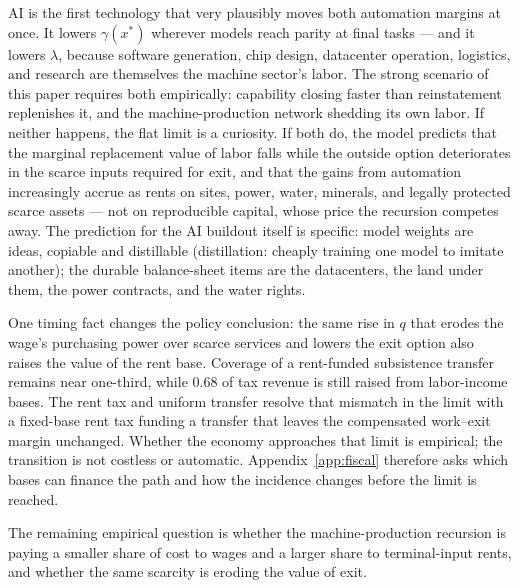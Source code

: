 \documentclass[12pt]{article}
\theoremstyle{plain}
\begin{document}
AI is the first technology that very plausibly moves both automation margins at once. It lowers $\gamma (x^*)$ wherever models reach parity at final tasks --- and it lowers $\lambda$, because software generation, chip design, datacenter operation, logistics, and research are themselves the machine sector's labor. The strong scenario of this paper requires both empirically: capability closing faster than reinstatement replenishes it, and the machine-production network shedding its own labor. If neither happens, the flat limit is a curiosity. If both do, the model predicts that the marginal replacement value of labor falls while the outside option deteriorates in the scarce inputs required for exit, and that the gains from automation increasingly accrue as rents on sites, power, water, minerals, and legally protected scarce assets --- not on reproducible capital, whose price the recursion competes away. The prediction for the AI buildout itself is specific: model weights are ideas, copiable and distillable (distillation: cheaply training one model to imitate another); the durable balance-sheet items are the datacenters, the land under them, the power contracts, and the water rights.

One timing fact changes the policy conclusion: the same rise in $q$ that erodes the wage's purchasing power over scarce services and lowers the exit option also raises the value of the rent base. Coverage of a rent-funded subsistence transfer remains near one-third, while 0.68 of tax revenue is still raised from labor-income bases. The rent tax and uniform transfer resolve that mismatch in the limit with a fixed-base rent tax funding a transfer that leaves the compensated work--exit margin unchanged. Whether the economy approaches that limit is empirical; the transition is not costless or automatic. Appendix~\ref{app:fiscal} therefore asks which bases can finance the path and how the incidence changes before the limit is reached.

The remaining empirical question is whether the machine-production recursion
is paying a smaller share of cost to wages and a larger share to
terminal-input rents, and whether the same scarcity is eroding the value of
exit.

\appendix
{}
\end{document}
